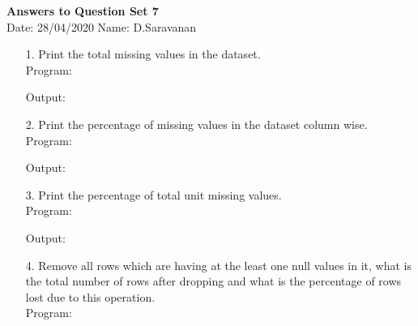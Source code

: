 \documentclass[a4paper,11pt,openright]{report}
\begin{document}
\singlespacing
\pagestyle{plain}

\begin{center}
\textbf{Answers to Question Set 7} \\
Date: 28/04/2020 \hspace{2mm} Name: D.Saravanan
\end{center}

\begin{enumerate}

\item[1.] Print the total missing values in the dataset. \\

Program:


\vspace{5px}

Output:


\vspace{5px}

\item[2.] Print the percentage of missing values in the dataset column wise. \\

Program:


\vspace{5px}

Output:


\vspace{5px}

\item[3.] Print the percentage of total unit missing values. \\

Program:


\vspace{5px}

Output:


\vspace{5px}

\item[4.] Remove all rows which are having at the least one null values in it, what is the
total number of rows after dropping and what is the percentage of rows lost due to this 
operation. \\

Program:


\vspace{5px}


\end{enumerate}
\end{document}
